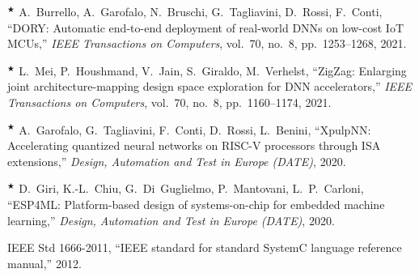 \documentclass[10pt,a4paper]{article}
\newcommand{\vstar}{$^\bigstar$}
\begin{document}
\begin{enumerate}[label={[\arabic*]}, leftmargin=2.6em, itemsep=5pt]
\item\vstar{} A.~Burrello, A.~Garofalo, N.~Bruschi, G.~Tagliavini, D.~Rossi, F.~Conti, ``DORY: Automatic end-to-end deployment of real-world DNNs on low-cost IoT MCUs,'' \emph{IEEE Transactions on Computers}, vol.~70, no.~8, pp.~1253--1268, 2021.
\item\vstar{} L.~Mei, P.~Houshmand, V.~Jain, S.~Giraldo, M.~Verhelst, ``ZigZag: Enlarging joint architecture-mapping design space exploration for DNN accelerators,'' \emph{IEEE Transactions on Computers}, vol.~70, no.~8, pp.~1160--1174, 2021.
\item\vstar{} A.~Garofalo, G.~Tagliavini, F.~Conti, D.~Rossi, L.~Benini, ``XpulpNN: Accelerating quantized neural networks on RISC-V processors through ISA extensions,'' \emph{Design, Automation and Test in Europe (DATE)}, 2020.
\item\vstar{} D.~Giri, K.-L.~Chiu, G.~Di~Guglielmo, P.~Mantovani, L.~P.~Carloni, ``ESP4ML: Platform-based design of systems-on-chip for embedded machine learning,'' \emph{Design, Automation and Test in Europe (DATE)}, 2020.
\item IEEE Std 1666-2011, ``IEEE standard for standard SystemC language reference manual,'' 2012.
\end{enumerate}
\end{document}
